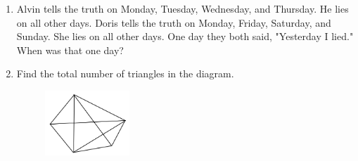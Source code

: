 \documentclass[11pt]{scrartcl}
\begin{document}
\begin{enumerate}
    \item Alvin tells the truth on Monday, Tuesday, Wednesday, and Thursday. He lies on all other days. Doris tells the truth on Monday, Friday, Saturday, and Sunday. She lies on all other days. One day they both said, "Yesterday I lied." When was that one day?

        
    \item Find the total number of triangles in the diagram.
    \begin{figure}[h]
        \centering
        \includegraphics[width=0.3\textwidth]{Test For Pelatihan/G7-8 and G3-4/manytriangles.png}
    \end{figure}
\end{enumerate}
\end{document}
